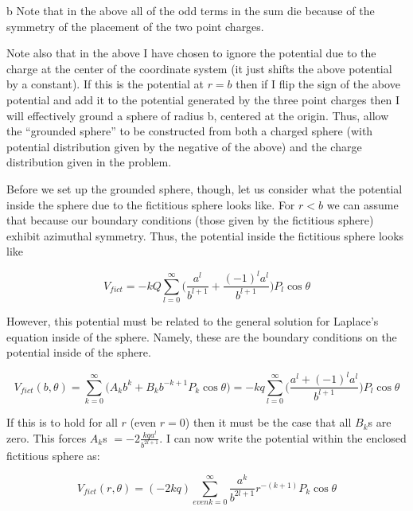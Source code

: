 \begin{homeworkProblem}[Jackson 3rd ed. : 3.7]
\begin{homeworkSection}{b}
Note that in the above all of the odd terms in the sum die because of the symmetry of the placement of the two point charges.
\\ \par
Note also that in the above I have chosen to ignore the potential due to the charge at the center of the coordinate system (it just shifts the above potential by a constant). If this is the potential at $r = b$ then if I flip the sign of the above potential and add it to the potential generated by the three point charges then I will effectively ground a sphere of radius b, centered at the origin. Thus, allow the ``grounded sphere'' to be constructed from both a charged sphere (with potential distribution given by the negative of the above) and the charge distribution given in the problem.
\\ \par
Before we set up the grounded sphere, though, let us consider what the potential inside the sphere due to the fictitious sphere looks like. For $r<b$ we can assume that because our boundary conditions (those given by the fictitious sphere) exhibit azimuthal symmetry. Thus, the potential inside the fictitious sphere looks like

\begin{center}
\[
V_{fict} = -kQ \sum\limits_{l=0}^{\infty}\Big(\frac{a^l}{b^{l+1}} + \frac{(-1)^l a^l}{b^{l+1}}\Big) P_l\cos\theta
\]
\end{center}

However, this potential must be related to the general solution for Laplace's equation inside of the sphere. Namely, these are the boundary conditions on the potential inside of the sphere.

\begin{center}
\[
	V_{fict}(b,\theta) = \sum\limits_{k=0}^{\infty}\Big(A_k b^k + B_k b^{-k+1} P_k\cos\theta \Big) = -kq \sum\limits_{l=0}^{\infty}\Big(\frac{a^l+(-1)^l a^l}{b^{l+1}}\Big) P_l\cos\theta
\]
\end{center}

If this is to hold for all $r$ (even $r=0$) then it must be the case that all $B_k$s are zero. This forces $A_k$s $=-2\frac{kq a^l}{b^{2l+1}}$. I can now write the potential within the enclosed fictitious sphere as:

\begin{center}
\[
V_{fict}(r,\theta) = (-2kq) \sum\limits_{even k=0}^\infty \frac{a^k}{b^{2l+1}} r^{-(k+1)} P_k\cos\theta
\]
\end{center}


\end{homeworkSection}
\end{homeworkProblem}
